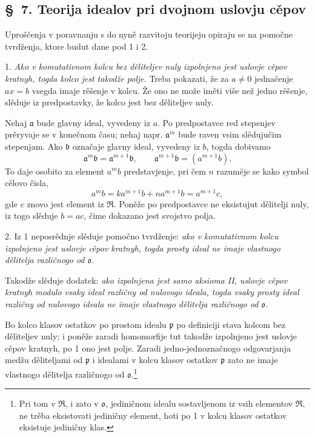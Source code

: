 \documentclass[11pt]{article}
\providecommand{\mR}{\mathfrak{R}}
\providecommand{\ma}{\mathfrak{a}}
\providecommand{\mb}{\mathfrak{b}}
\providecommand{\mo}{\mathfrak{o}}
\providecommand{\mpideal}{\mathfrak{p}}
\begin{document}
\setcounter{footnote}{28}

\subsection*{\S~7. Teorija idealov pri dvojnom uslovju cěpov}

Uproščenja v poravnanju s do nyně razvitoju teorijeju opiraju se na pomočne tvrdženja, ktore budut dane pod 1 i 2.

1. \emph{Ako v komutativnom kolcu bez děliteljev nuly izpolnjeno jest uslovje cěpov kratnyh, togda kolco jest takodže polje.} Treba pokazati, že za $a\ne0$ jednačenje $ax=b$ vsegda imaje rěšenje v kolcu. Že ono ne može iměti više než jedno rěšenje, slěduje iz predpostavky, že kolco jest bez děliteljev nuly.

Nehaj $\ma$ bude glavny ideal, vyvedeny iz $a$. Po predpostavce red stepenjev prěryvaje se v konečnom času; nehaj napr. $\ma^m$ bude raven vsim slědujučim stepenjam. Ako $\mb$ označaje glavny ideal, vyvedeny iz $b$, togda dobivamo
\[
\ma^m\mb=\ma^{m+1}\mb,
\qquad \ma^{m+1}\mb=(a^{m+1}b).
\]
To daje osobito za element $a^m b$ predstavjenje, pri čem $n$ razuměje se kako symbol cělovo čisla,
\[
 a^m b=k a^{m+1}b+n a^{m+1}b=a^{m+1}c,
\]
gde $c$ znovo jest element iz $\mR$. Poněže po predpostavce ne eksistujut dělitelji nuly, iz togo slěduje $b=ac$, čime dokazano jest svojstvo polja.

2. Iz 1 neposrědnje slěduje pomočno tvrdženje: \emph{ako v komutativnom kolcu izpolnjeno jest uslovje cěpov kratnyh, togda prosty ideal ne imaje vlastnogo dělitelja različnogo od $\mo$.}

Takodže slěduje dodatek: \emph{ako izpolnjena jest samo aksioma II, uslovje cěpov kratnyh modulo vsaky ideal različny od nulovogo ideala, togda vsaky prosty ideal različny od nulovogo ideala ne imaje vlastnogo dělitelja različnogo od $\mo$.}

Bo kolco klasov ostatkov po prostom idealu $\mpideal$ po definiciji stava kolcom bez děliteljev nuly; i poněže zaradi homomorfije tut takodže izpolnjeno jest uslovje cěpov kratnyh, po 1 ono jest polje. Zaradi jedno-jednoznačnogo odgovarjanja medžu děliteljami od $\mpideal$ i idealami v kolcu klasov ostatkov $\mpideal$ zato ne imaje vlastnogo dělitelja različnogo od $\mo$.\footnote{Pri tom v $\mR$, i zato v $\mo$, jediničnom idealu sostavljenom iz vsih elementov $\mR$, ne trěba eksistovati jediničny element, hoti po 1 v kolcu klasov ostatkov eksistuje jediničny klas.}
\end{document}
